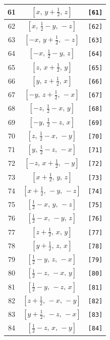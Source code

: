 \documentclass[fleqn,8pt]{jsarticle}
\begin{document}
\begin{longtable}{ccc}
61 & $\left[ x,\, y + \frac{1}{2},\, z \right]$ & {\tt [61]} \\ \hline
62 & $\left[ x,\, \frac{1}{2} - y,\, - z \right]$ & {\tt [62]} \\ \hline
63 & $\left[ - x,\, y + \frac{1}{2},\, - z \right]$ & {\tt [63]} \\ \hline
64 & $\left[ - x,\, \frac{1}{2} - y,\, z \right]$ & {\tt [64]} \\ \hline
65 & $\left[ z,\, x + \frac{1}{2},\, y \right]$ & {\tt [65]} \\ \hline
66 & $\left[ y,\, z + \frac{1}{2},\, x \right]$ & {\tt [66]} \\ \hline
67 & $\left[ - y,\, z + \frac{1}{2},\, - x \right]$ & {\tt [67]} \\ \hline
68 & $\left[ - z,\, \frac{1}{2} - x,\, y \right]$ & {\tt [68]} \\ \hline
69 & $\left[ - y,\, \frac{1}{2} - z,\, x \right]$ & {\tt [69]} \\ \hline
70 & $\left[ z,\, \frac{1}{2} - x,\, - y \right]$ & {\tt [70]} \\ \hline
71 & $\left[ y,\, \frac{1}{2} - z,\, - x \right]$ & {\tt [71]} \\ \hline
72 & $\left[ - z,\, x + \frac{1}{2},\, - y \right]$ & {\tt [72]} \\ \hline
73 & $\left[ x + \frac{1}{2},\, y,\, z \right]$ & {\tt [73]} \\ \hline
74 & $\left[ x + \frac{1}{2},\, - y,\, - z \right]$ & {\tt [74]} \\ \hline
75 & $\left[ \frac{1}{2} - x,\, y,\, - z \right]$ & {\tt [75]} \\ \hline
76 & $\left[ \frac{1}{2} - x,\, - y,\, z \right]$ & {\tt [76]} \\ \hline
77 & $\left[ z + \frac{1}{2},\, x,\, y \right]$ & {\tt [77]} \\ \hline
78 & $\left[ y + \frac{1}{2},\, z,\, x \right]$ & {\tt [78]} \\ \hline
79 & $\left[ \frac{1}{2} - y,\, z,\, - x \right]$ & {\tt [79]} \\ \hline
80 & $\left[ \frac{1}{2} - z,\, - x,\, y \right]$ & {\tt [80]} \\ \hline
81 & $\left[ \frac{1}{2} - y,\, - z,\, x \right]$ & {\tt [81]} \\ \hline
82 & $\left[ z + \frac{1}{2},\, - x,\, - y \right]$ & {\tt [82]} \\ \hline
83 & $\left[ y + \frac{1}{2},\, - z,\, - x \right]$ & {\tt [83]} \\ \hline
84 & $\left[ \frac{1}{2} - z,\, x,\, - y \right]$ & {\tt [84]} \\ \hline

\end{longtable}
\end{document}
